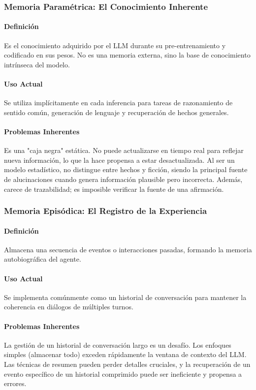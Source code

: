 \documentclass[conference]{IEEEtran}
\begin{document}
\subsubsection{Memoria Paramétrica: El Conocimiento Inherente}
\paragraph{Definición} Es el conocimiento adquirido por el LLM durante su pre-entrenamiento y codificado en sus pesos. No es una memoria externa, sino la base de conocimiento intrínseca del modelo.

\paragraph{Uso Actual} Se utiliza implícitamente en cada inferencia para tareas de razonamiento de sentido común, generación de lenguaje y recuperación de hechos generales.

\paragraph{Problemas Inherentes} Es una "caja negra" estática. No puede actualizarse en tiempo real para reflejar nueva información, lo que la hace propensa a estar desactualizada. Al ser un modelo estadístico, no distingue entre hechos y ficción, siendo la principal fuente de alucinaciones cuando genera información plausible pero incorrecta. Además, carece de trazabilidad; es imposible verificar la fuente de una afirmación.

\subsubsection{Memoria Episódica: El Registro de la Experiencia}
\paragraph{Definición} Almacena una secuencia de eventos o interacciones pasadas, formando la memoria autobiográfica del agente.

\paragraph{Uso Actual} Se implementa comúnmente como un historial de conversación para mantener la coherencia en diálogos de múltiples turnos.

\paragraph{Problemas Inherentes} La gestión de un historial de conversación largo es un desafío. Los enfoques simples (almacenar todo) exceden rápidamente la ventana de contexto del LLM. Las técnicas de resumen pueden perder detalles cruciales, y la recuperación de un evento específico de un historial comprimido puede ser ineficiente y propensa a errores.
\end{document}
